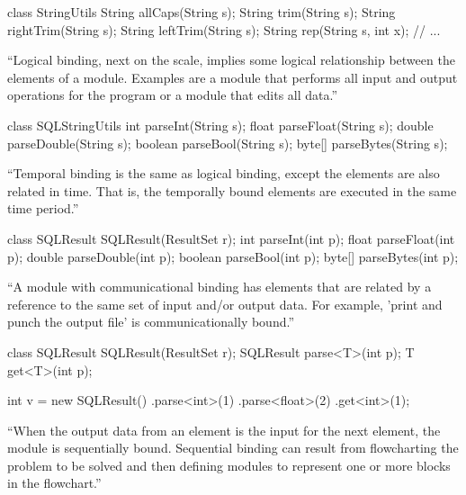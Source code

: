 \documentclass{article}
\begin{document}
\begin{multicols}{2}
{\small\begin{ffcode}
class StringUtils {
  String allCaps(String s);
  String trim(String s);
  String rightTrim(String s);
  String leftTrim(String s);
  String rep(String s, int x);
  // ...
}
\end{ffcode}
}
\par\columnbreak\par
``Logical binding, next on the scale, implies some logical relationship between the elements of a module. Examples are a module that performs all input and output operations for the program or a module that edits all data.''
\end{multicols}
\plush{}

\begin{multicols}{2}
{\small\begin{ffcode}
class SQLStringUtils {
  int parseInt(String s);
  float parseFloat(String s);
  double parseDouble(String s);
  boolean parseBool(String s);
  byte[] parseBytes(String s);
}
\end{ffcode}
}
\par\columnbreak\par
``Temporal binding is the same as logical binding, except the elements are also related in time. That is, the temporally bound elements are executed in the same time period.''
\end{multicols}
\plush{}

\begin{multicols}{2}
{\small\begin{ffcode}
class SQLResult {
  SQLResult(ResultSet r);
  int parseInt(int p);
  float parseFloat(int p);
  double parseDouble(int p);
  boolean parseBool(int p);
  byte[] parseBytes(int p);
}
\end{ffcode}
}
\par\columnbreak\par
``A module with communicational binding has elements that are related by a reference to the same set of input and/or output data. For example, 'print and punch the output file' is communicationally bound.''
\end{multicols}
\plush{}

\begin{multicols}{2}
{\small\begin{ffcode}
class SQLResult {
  SQLResult(ResultSet r);
  SQLResult parse<T>(int p);
  T get<T>(int p);
}

int v = new SQLResult()
  .parse<int>(1)
  .parse<float>(2)
  .get<int>(1);
\end{ffcode}
}
\par\columnbreak\par
``When the output data from an element is the input for the next element, the module is sequentially bound. Sequential binding can result from flowcharting the problem to be solved and then defining modules to represent one or more blocks in the flowchart.''
\end{multicols}
\plush{}
\end{document}
